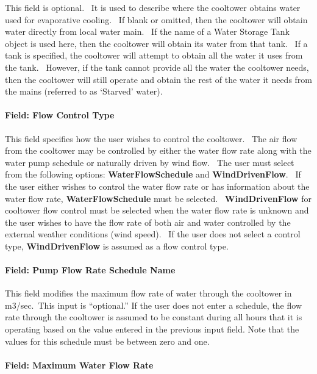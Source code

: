 This field is optional. ~It is used to describe where the cooltower obtains water used for evaporative cooling. ~If blank or omitted, then the cooltower will obtain water directly from local water main. ~If the name of a Water Storage Tank object is used here, then the cooltower will obtain its water from that tank. ~If a tank is specified, the cooltower will attempt to obtain all the water it uses from the tank. ~However, if the tank cannot provide all the water the cooltower needs, then the cooltower will still operate and obtain the rest of the water it needs from the mains (referred to as `Starved' water).

\paragraph{Field: Flow Control Type}\label{field-flow-control-type}

This field specifies how the user wishes to control the cooltower.~ The air flow from the cooltower may be controlled by either the water flow rate along with the water pump schedule or naturally driven by wind flow.~ The user must select from the following options: \textbf{WaterFlowSchedule} and \textbf{WindDrivenFlow}.~ If the user either wishes to control the water flow rate or has information about the water flow rate, \textbf{WaterFlowSchedule} must be selected.~ \textbf{WindDrivenFlow} for cooltower flow control must be selected when the water flow rate is unknown and the user wishes to have the flow rate of both air and water controlled by the external weather conditions (wind speed).~ If the user does not select a control type, \textbf{WindDrivenFlow} is assumed as a flow control type.

\paragraph{Field: Pump Flow Rate Schedule Name}\label{field-pump-flow-rate-schedule-name}

This field modifies the maximum flow rate of water through the cooltower in m3/sec.~This input is ``optional.'' If the user does not enter a schedule, the flow rate through the cooltower is assumed to be constant during all hours that it is operating based on the value entered in the previous input field. Note that the values for this schedule must be between zero and one.

\paragraph{Field: Maximum Water Flow Rate}\label{field-maximum-water-flow-rate}

